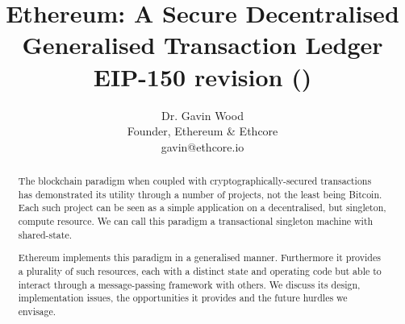 \documentclass[9pt,oneside]{amsart}
\title{Ethereum: A Secure Decentralised Generalised Transaction Ledger \\ {\smaller \textbf{EIP-150 revision (\YellowPaperVersionNumber{})}}}
\author{
    Dr. Gavin Wood\\
    Founder, Ethereum \& Ethcore\\
    gavin@ethcore.io
}
\begin{document}
\pagecolor{lightyellow}

\begin{abstract}
The blockchain paradigm when coupled with cryptographically-secured transactions has demonstrated its utility through a number of projects, not the least being Bitcoin. Each such project can be seen as a simple application on a decentralised, but singleton, compute resource. We can call this paradigm a transactional singleton machine with shared-state.

Ethereum implements this paradigm in a generalised manner. Furthermore it provides a plurality of such resources, each with a distinct state and operating code but able to interact through a message-passing framework with others. We discuss its design, implementation issues, the opportunities it provides and the future hurdles we envisage.
\end{abstract}

\maketitle
\end{document}
